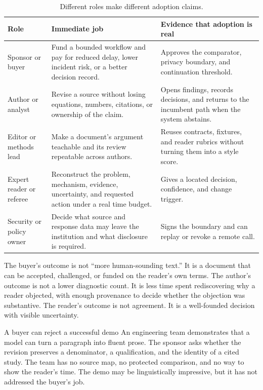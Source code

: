 \begin{table}[H]
\centering
\small
\begin{tabularx}{\textwidth}{@{}p{}p{}L@{}}
\toprule
Role & Immediate job & Evidence that adoption is real \\
\midrule
Sponsor or buyer & Fund a bounded workflow and pay for reduced delay,
lower incident risk, or a better decision record. & Approves the comparator,
privacy boundary, and continuation threshold. \\
Author or analyst & Revise a source without losing equations, numbers,
citations, or ownership of the claim. & Opens findings, records decisions, and
returns to the incumbent path when the system abstains. \\
Editor or methods lead & Make a document's argument teachable and its review
repeatable across authors. & Reuses contracts, fixtures, and reader rubrics
without turning them into a style score. \\
Expert reader or referee & Reconstruct the problem, mechanism, evidence,
uncertainty, and requested action under a real time budget. & Gives a located
decision, confidence, and change trigger. \\
Security or policy owner & Decide what source and response data may leave the
institution and what disclosure is required. & Signs the boundary and can
replay or revoke a remote call. \\
\bottomrule
\end{tabularx}
\caption{Different roles make different adoption claims.}
\label{tab:adoption-roles}
\end{table}

The buyer's outcome is not ``more human-sounding text.'' It is a document that
can be accepted, challenged, or funded on the reader's own terms. The author's
outcome is not a lower diagnostic count. It is less time spent rediscovering
why a reader objected, with enough provenance to decide whether the objection
was substantive. The reader's outcome is not agreement. It is a well-founded
decision with visible uncertainty.

\begin{cardexample}{A buyer can reject a successful demo}
An engineering team demonstrates that a model can turn a paragraph into fluent
prose. The sponsor asks whether the revision preserves a denominator, a
qualification, and the identity of a cited study. The team has no source map,
no protected comparison, and no way to show the reader's time. The demo may be
linguistically impressive, but it has not addressed the buyer's job.
\end{cardexample}

